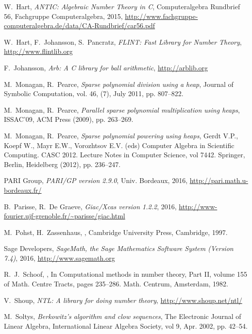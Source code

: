 \documentclass{sig-alternate-05-2015}
\begin{document}
\begin{thebibliography}{99}
W.~Hart, {\em ANTIC: Algebraic Number Theory in C}, Computeralgebra Rundbrief 56, Fachgruppe Computeralgebra, 2015, \url{http://www.fachgruppe-computeralgebra.de/data/CA-Rundbrief/car56.pdf}

W.~Hart, F.~Johansson, S.~Pancratz, {\em FLINT: Fast Library for Number Theory}, \url{http://www.flintlib.org}

F.~Johansson, {\em Arb: A C library for ball arithmetic}, \url{http://arblib.org}

M.~Monagan, R.~Pearce, {\em Sparse polynomial division using a heap}, Journal of Symbolic Computation, vol. 46, (7), July 2011, pp. 807--822.

M.~Monagan, R.~Pearce, {\em Parallel sparse polynomial multiplication using heaps}, ISSAC'09, ACM Press (2009), pp. 263--269.

M.~Monagan, R.~Pearce, {\em Sparse polynomial powering using heaps}, Gerdt V.P., Koepf W., Mayr E.W., Vorozhtsov E.V. (eds) Computer Algebra in Scientific Computing. CASC 2012. Lecture Notes in Computer Science, vol 7442. Springer, Berlin, Heidelberg (2012), pp. 236--247.

PARI Group, {\em PARI/GP version 2.9.0}, Univ. Bordeaux, 2016, \url{http://pari.math.u-bordeaux.fr/}

B.~Parisse, R.~De Graeve, {\em Giac/Xcas version 1.2.2}, 2016, \url{http://www-fourier.ujf-grenoble.fr/~parisse/giac.html}

M.~Pohst, H.~Zassenhaus,
,
\newblock Cambridge University Press, Cambridge, 1997.

Sage Developers, {\em SageMath, the Sage Mathematics Software System (Version 7.4)}, 2016,  \url{http://www.sagemath.org}

R.~J.~Schoof,
,
\newblock In Computational methods in number theory, {P}art {II}, volume
  155 of Math. Centre Tracts, pages 235--286. Math. Centrum, Amsterdam,
  1982.

V.~Shoup, {\em NTL: A library for doing number theory}, \url{http://www.shoup.net/ntl/}

M.~Soltys, {\em Berkowitz's algorithm and clow sequences}, The Electronic Journal of Linear Algebra, International Linear Algebra Society, vol 9, Apr. 2002, pp. 42--54.

%
%
\end{thebibliography}
\end{document}
